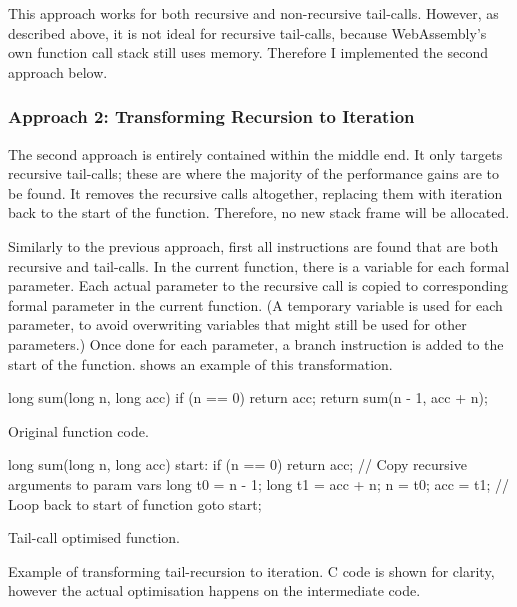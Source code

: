 \documentclass[00-main.tex]{subfiles}
\begin{document}
This approach works for both recursive and non-recursive tail-calls.
However, as described above, it is not ideal for recursive tail-calls, because WebAssembly's own function call stack still uses  memory.
Therefore I implemented the second approach below.

\subsubsection{Approach 2: Transforming Recursion to Iteration}

The second approach is entirely contained within the middle end.
It only targets recursive tail-calls; these are where the majority of the performance gains are to be found.
It removes the recursive calls altogether, replacing them with iteration back to the start of the function.
Therefore, no new stack frame will be allocated.

Similarly to the previous approach, first all  instructions are found that are both recursive and tail-calls.
In the current function, there is a variable for each formal parameter.
Each actual parameter to the recursive call is copied to corresponding formal parameter in the current function.
(A temporary variable is used for each parameter, to avoid overwriting variables that might still be used for other parameters.)
Once done for each parameter, a branch instruction is added to the start of the function.
 shows an example of this transformation.

\begin{listing}[!b]
  \begin{sublisting}[b]{0.49\textwidth}
    \begin{CListing}
      long sum(long n, long acc) {
          if (n == 0) {
              return acc;
          }
          return sum(n - 1, acc + n);
      }
    \end{CListing}
    \caption{Original function code.}
  \end{sublisting}
  \hfill
  \begin{sublisting}[b]{0.49\textwidth}
    \begin{CListing}
      long sum(long n, long acc) {
      start:
          if (n == 0) return acc;
          // Copy recursive arguments to param vars
          long t0 = n - 1;
          long t1 = acc + n;
          n = t0;
          acc = t1;
          // Loop back to start of function
          goto start;
      }
    \end{CListing}
    \caption{Tail-call optimised function.}
  \end{sublisting}
  \caption{Example of transforming tail-recursion to iteration. C code is shown for clarity, however the actual optimisation happens on the intermediate code.}
  \label{lst:tail-call optimisation example}
\end{listing}
\end{document}
